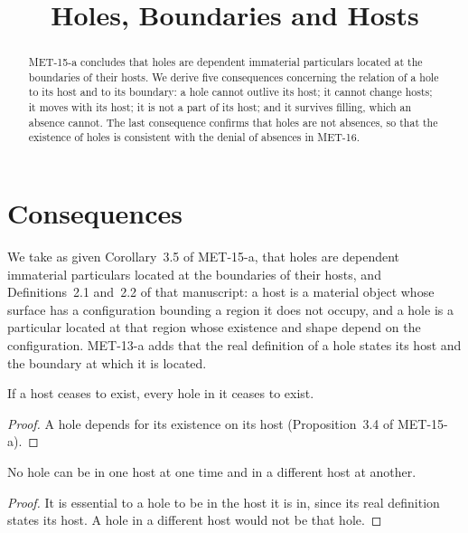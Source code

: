\documentclass{situationist-preprint}
\title{Holes, Boundaries and Hosts}
\begin{document}
\maketitle

\begin{abstract}
MET-15-a concludes that holes are dependent immaterial particulars located at the boundaries of their hosts. We derive five consequences concerning the relation of a hole to its host and to its boundary: a hole cannot outlive its host; it cannot change hosts; it moves with its host; it is not a part of its host; and it survives filling, which an absence cannot. The last consequence confirms that holes are not absences, so that the existence of holes is consistent with the denial of absences in MET-16.
\end{abstract}

\section{Consequences}

We take as given Corollary~3.5 of MET-15-a, that holes are dependent immaterial particulars located at the boundaries of their hosts, and Definitions~2.1 and~2.2 of that manuscript: a host is a material object whose surface has a configuration bounding a region it does not occupy, and a hole is a particular located at that region whose existence and shape depend on the configuration. MET-13-a adds that the real definition of a hole states its host and the boundary at which it is located.

\begin{corollary}\label{c:survival}
If a host ceases to exist, every hole in it ceases to exist.
\end{corollary}

\begin{proof}
A hole depends for its existence on its host (Proposition~3.4 of MET-15-a).
\end{proof}

\begin{corollary}\label{c:rigid}
No hole can be in one host at one time and in a different host at another.
\end{corollary}

\begin{proof}
It is essential to a hole to be in the host it is in, since its real definition states its host. A hole in a different host would not be that hole.
\end{proof}
\end{document}
